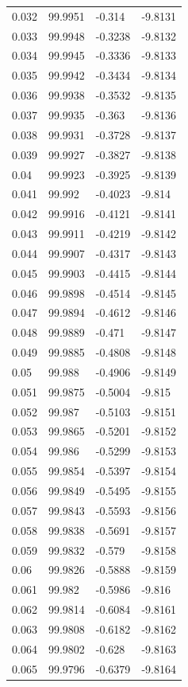 \begin{tabular}{llll}
0.032 & 99.9951 & -0.314 & -9.8131 \\
0.033 & 99.9948 & -0.3238 & -9.8132 \\
0.034 & 99.9945 & -0.3336 & -9.8133 \\
0.035 & 99.9942 & -0.3434 & -9.8134 \\
0.036 & 99.9938 & -0.3532 & -9.8135 \\
0.037 & 99.9935 & -0.363 & -9.8136 \\
0.038 & 99.9931 & -0.3728 & -9.8137 \\
0.039 & 99.9927 & -0.3827 & -9.8138 \\
0.04 & 99.9923 & -0.3925 & -9.8139 \\
0.041 & 99.992 & -0.4023 & -9.814 \\
0.042 & 99.9916 & -0.4121 & -9.8141 \\
0.043 & 99.9911 & -0.4219 & -9.8142 \\
0.044 & 99.9907 & -0.4317 & -9.8143 \\
0.045 & 99.9903 & -0.4415 & -9.8144 \\
0.046 & 99.9898 & -0.4514 & -9.8145 \\
0.047 & 99.9894 & -0.4612 & -9.8146 \\
0.048 & 99.9889 & -0.471 & -9.8147 \\
0.049 & 99.9885 & -0.4808 & -9.8148 \\
0.05 & 99.988 & -0.4906 & -9.8149 \\
0.051 & 99.9875 & -0.5004 & -9.815 \\
0.052 & 99.987 & -0.5103 & -9.8151 \\
0.053 & 99.9865 & -0.5201 & -9.8152 \\
0.054 & 99.986 & -0.5299 & -9.8153 \\
0.055 & 99.9854 & -0.5397 & -9.8154 \\
0.056 & 99.9849 & -0.5495 & -9.8155 \\
0.057 & 99.9843 & -0.5593 & -9.8156 \\
0.058 & 99.9838 & -0.5691 & -9.8157 \\
0.059 & 99.9832 & -0.579 & -9.8158 \\
0.06 & 99.9826 & -0.5888 & -9.8159 \\
0.061 & 99.982 & -0.5986 & -9.816 \\
0.062 & 99.9814 & -0.6084 & -9.8161 \\
0.063 & 99.9808 & -0.6182 & -9.8162 \\
0.064 & 99.9802 & -0.628 & -9.8163 \\
0.065 & 99.9796 & -0.6379 & -9.8164 \\

\end{tabular}
